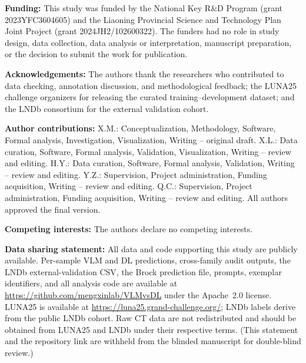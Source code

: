 \documentclass[11pt]{article}
\begin{document}
\vspace{1em}
\noindent\textbf{Funding:} This study was funded by the National Key R\&D Program (grant 2023YFC3604605) and the Liaoning Provincial Science and Technology Plan Joint Project (grant 2024JH2/102600322). The funders had no role in study design, data collection, data analysis or interpretation, manuscript preparation, or the decision to submit the work for publication.

\vspace{1em}
\noindent\textbf{Acknowledgements:} The authors thank the researchers who contributed to data checking, annotation discussion, and methodological feedback; the LUNA25 challenge organizers for releasing the curated training--development dataset; and the LNDb consortium for the external validation cohort.

\vspace{1em}
\noindent\textbf{Author contributions:} X.M.: Conceptualization, Methodology, Software, Formal analysis, Investigation, Visualization, Writing -- original draft. X.L.: Data curation, Software, Formal analysis, Validation, Visualization, Writing -- review and editing. H.Y.: Data curation, Software, Formal analysis, Validation, Writing -- review and editing. Y.Z.: Supervision, Project administration, Funding acquisition, Writing -- review and editing. Q.C.: Supervision, Project administration, Funding acquisition, Writing -- review and editing. All authors approved the final version.

\vspace{1em}
\noindent\textbf{Competing interests:} The authors declare no competing interests.

\vspace{1em}
\noindent\textbf{Data sharing statement:} All data and code supporting this study are publicly available. Per-sample VLM and DL predictions, cross-family audit outputs, the LNDb external-validation CSV, the Brock prediction file, prompts, exemplar identifiers, and all analysis code are available at \url{https://github.com/mengxinlab/VLMvsDL} under the Apache~2.0 license. LUNA25 is available at \url{https://luna25.grand-challenge.org/}; LNDb labels derive from the public LNDb cohort. Raw CT data are not redistributed and should be obtained from LUNA25 and LNDb under their respective terms. (This statement and the repository link are withheld from the blinded manuscript for double-blind review.)
\end{document}
